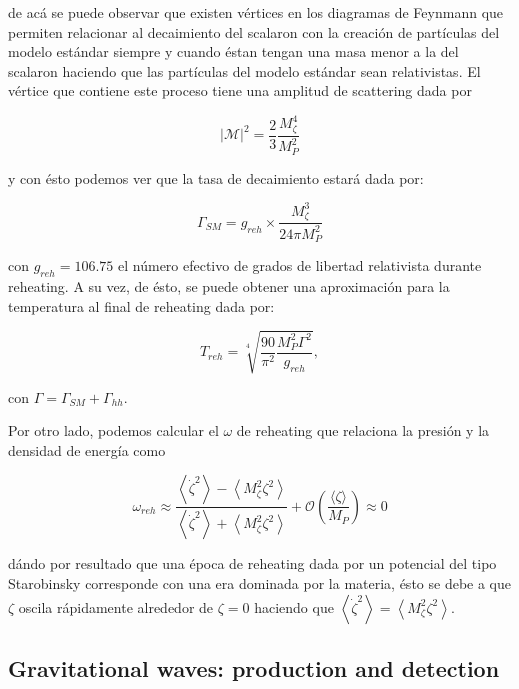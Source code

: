 \noindent
de acá se puede observar que existen vértices en los diagramas de Feynmann que permiten relacionar al decaimiento del scalaron con la creación de partículas del modelo estándar siempre y cuando éstan tengan una masa menor a la del scalaron haciendo que las partículas del modelo estándar sean relativistas. El vértice que contiene este proceso tiene una amplitud de scattering dada por

\begin{equation}
    \left| \mathcal{M} \right|^2 = \frac{2}{3} \frac{M_\zeta^4}{M_P^2}
\end{equation}

\noindent
y con ésto podemos ver que la tasa de decaimiento estará dada por:

\begin{equation}
    \Gamma_{SM} = g_{reh} \times \frac{M_\zeta^3}{24 \pi M^2_P}
\end{equation}

\noindent
con $g_{reh} = 106.75$ el número efectivo de grados de libertad relativista durante reheating. A su vez, de ésto, se puede obtener una aproximación para la temperatura al final de reheating dada por:

\begin{equation}
    T_{reh} = \sqrt[4]{\frac{90}{\pi^2} \frac{M_P^2 \Gamma^2}{g_{reh}}},
\end{equation}

\noindent
con $\Gamma = \Gamma_{SM} + \Gamma_{hh}$.

Por otro lado, podemos calcular el $\omega$ de reheating que relaciona la presión y la densidad de energía como 

\begin{equation}
    \omega_{reh} \approx \frac{\left\langle \dot{\zeta}^2 \right\rangle - \left\langle M^2_\zeta \zeta^2 \right\rangle}{\left\langle \dot{\zeta}^2 \right\rangle + \left\langle M^2_\zeta \zeta^2 \right\rangle} + \mathcal{O} \left( \frac{\langle \zeta \rangle}{M_P} \right) \approx 0
\end{equation}

\noindent
dándo por resultado que una época de reheating dada por un potencial del tipo Starobinsky corresponde con una era dominada por la materia, ésto se debe a que $\zeta$ oscila rápidamente alrededor de $\zeta = 0$ haciendo que $\left\langle \dot{\zeta}^2 \right\rangle = \left\langle M_\zeta^2 \zeta^2 \right\rangle$.

\subsection{Gravitational waves: production and detection}

